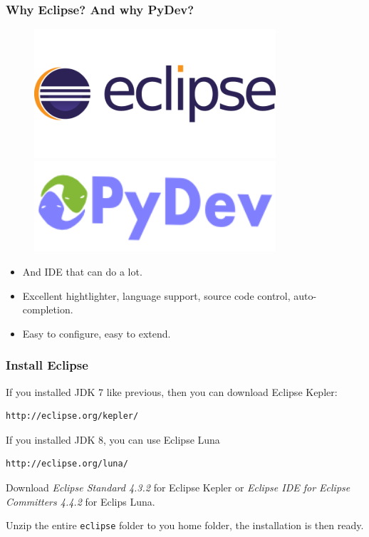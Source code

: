 \documentclass{beamer}
\begin{document}
\begin{frame}
\frametitle{Why Eclipse? And why PyDev?}

\begin{minipage}{0.3\textwidth}
\begin{figure}
\includegraphics[width=0.8\textwidth]{eclipse_logo.png}\\
\includegraphics[width=0.8\textwidth]{pydev_logo.png}
\end{figure}
\end{minipage}
\begin{minipage}{0.6\textwidth}
\begin{itemize}
\item[\ding{79}] And IDE that can do a lot.
\item[\ding{79}] Excellent hightlighter, language support, source code control, auto-completion.
\item[\ding{79}] Easy to configure, easy to extend.
\end{itemize}
\end{minipage}

\end{frame}

\begin{frame}[fragile]
\frametitle{Install Eclipse}

If you installed JDK 7 like previous, then you can download Eclipse Kepler:
\begin{verbatim}
http://eclipse.org/kepler/
\end{verbatim}
If you installed JDK 8, you can use Eclipse Luna
\begin{verbatim}
http://eclipse.org/luna/
\end{verbatim}

Download \emph{Eclipse Standard 4.3.2} for Eclipse Kepler or \emph{Eclipse IDE for Eclipse Committers 4.4.2} for Eclips Luna.

Unzip the entire \texttt{eclipse} folder to you home folder, the installation is then ready. 

\end{frame}
\end{document}
